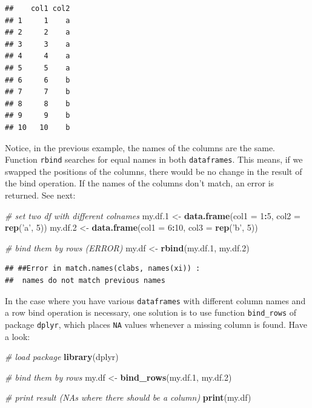 \documentclass[11pt,]{book}
\newenvironment{Shaded}{\begin{snugshade}}{\end{snugshade}}
\newcommand{\KeywordTok}[1]{\textcolor[rgb]{0.27,0.27,0.27}{\textbf{#1}}}
\newcommand{\DataTypeTok}[1]{\textcolor[rgb]{0.27,0.27,0.27}{#1}}
\newcommand{\DecValTok}[1]{\textcolor[rgb]{0.06,0.06,0.06}{#1}}
\newcommand{\StringTok}[1]{\textcolor[rgb]{0.5,0.5,0.5}{#1}}
\newcommand{\CommentTok}[1]{\textcolor[rgb]{0.56,0.35,0.01}{\textit{#1}}}
\newcommand{\OperatorTok}[1]{\textcolor[rgb]{0.81,0.36,0.00}{\textbf{#1}}}
\newcommand{\NormalTok}[1]{#1}
\begin{document}
\begin{verbatim}
##    col1 col2
## 1     1    a
## 2     2    a
## 3     3    a
## 4     4    a
## 5     5    a
## 6     6    b
## 7     7    b
## 8     8    b
## 9     9    b
## 10   10    b
\end{verbatim}

Notice, in the previous example, the names of the columns are the same.
Function \texttt{rbind} searches for equal names in both
\texttt{dataframes}. This means, if we swapped the positions of the
columns, there would be no change in the result of the bind operation.
If the names of the columns don't match, an error is returned. See next:

\begin{Shaded}
\begin{Highlighting}[]
\CommentTok{# set two df with different colnames}
\NormalTok{my.df.}\DecValTok{1}\NormalTok{ <-}\StringTok{ }\KeywordTok{data.frame}\NormalTok{(}\DataTypeTok{col1 =} \DecValTok{1}\OperatorTok{:}\DecValTok{5}\NormalTok{, }
                      \DataTypeTok{col2 =} \KeywordTok{rep}\NormalTok{(}\StringTok{'a'}\NormalTok{, }\DecValTok{5}\NormalTok{))}
\NormalTok{my.df.}\DecValTok{2}\NormalTok{ <-}\StringTok{ }\KeywordTok{data.frame}\NormalTok{(}\DataTypeTok{col1 =} \DecValTok{6}\OperatorTok{:}\DecValTok{10}\NormalTok{, }
                      \DataTypeTok{col3 =} \KeywordTok{rep}\NormalTok{(}\StringTok{'b'}\NormalTok{, }\DecValTok{5}\NormalTok{))}

\CommentTok{# bind them by rows (ERROR)}
\NormalTok{my.df <-}\StringTok{ }\KeywordTok{rbind}\NormalTok{(my.df.}\DecValTok{1}\NormalTok{, my.df.}\DecValTok{2}\NormalTok{)}
\end{Highlighting}
\end{Shaded}

\begin{verbatim}
## ##Error in match.names(clabs, names(xi)) :
##  names do not match previous names
\end{verbatim}

In the case where you have various \texttt{dataframes} with different
column names and a row bind operation is necessary, one solution is to
use function \texttt{bind\_rows} of package \texttt{dplyr}, which places
\texttt{NA} values whenever a missing column is found. Have a look:

\begin{Shaded}
\begin{Highlighting}[]
\CommentTok{# load package}
\KeywordTok{library}\NormalTok{(dplyr)}

\CommentTok{# bind them by rows}
\NormalTok{my.df <-}\StringTok{ }\KeywordTok{bind_rows}\NormalTok{(my.df.}\DecValTok{1}\NormalTok{, }
\NormalTok{                   my.df.}\DecValTok{2}\NormalTok{)}

\CommentTok{# print result (NAs where there should be a column)}
\KeywordTok{print}\NormalTok{(my.df)}
\end{Highlighting}
\end{Shaded}
\end{document}
